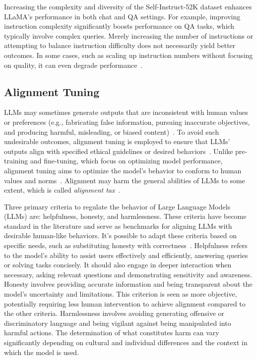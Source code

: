 Increasing the complexity and diversity of the Self-Instruct-52K dataset enhances LLaMA's performance in both chat and QA settings.
For example, improving instruction complexity significantly boosts performance on QA tasks, which typically involve complex queries.
Merely increasing the number of instructions or attempting to balance instruction difficulty does not necessarily yield better outcomes.
In some cases, such as scaling up instruction numbers without focusing on quality, it can even degrade performance~\cite{survey}.

\subsection{Alignment Tuning}
\label{subsec:alignment-tuning}

LLMs may sometimes generate outputs that are inconsistent with human values or preferences (e.g., fabricating false information, pursuing inaccurate objectives, and producing harmful, misleading, or biased content)~\cite{ouyang2022training, kenton2021alignment}.
To avoid such undesirable outcomes, alignment tuning is employed to ensure that LLMs' outputs align with specified ethical guidelines or desired behaviors~\cite{survey}.
Unlike pre-training and fine-tuning, which focus on optimizing model performance, alignment tuning aims to optimize the model's behavior to conform to human values and norms~\cite{survey}.
Alignment may harm the general abilities of LLMs to some extent, which is called \textit{alignment tax}~\cite{askell2021general}.

Three primary criteria to regulate the behavior of Large Language Models (LLMs) are: helpfulness, honesty, and harmlessness.
These criteria have become standard in the literature and serve as benchmarks for aligning LLMs with desirable human-like behaviors.
It's possible to adapt these criteria based on specific needs, such as substituting honesty with correctness~\cite{glaese2022improving}.
Helpfulness refers to the model's ability to assist users effectively and efficiently, answering queries or solving tasks concisely.
It should also engage in deeper interaction when necessary, asking relevant questions and demonstrating sensitivity and awareness.
Honesty involves providing accurate information and being transparent about the model's uncertainty and limitations.
This criterion is seen as more objective, potentially requiring less human intervention to achieve alignment compared to the other criteria.
Harmlessness involves avoiding generating offensive or discriminatory language and being vigilant against being manipulated into harmful actions.
The determination of what constitutes harm can vary significantly depending on cultural and individual differences and the context in which the model is used.

